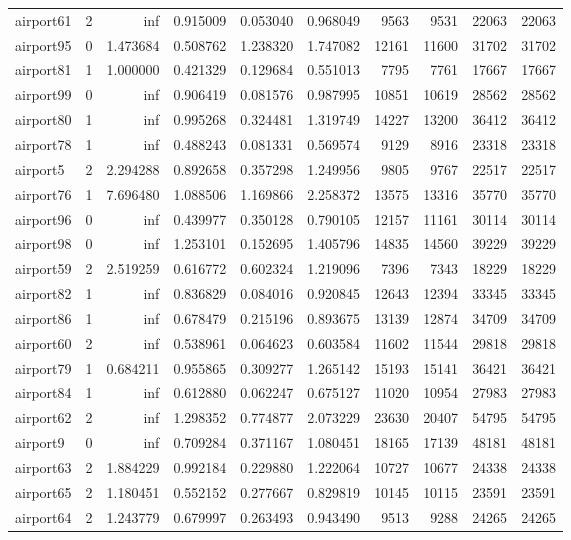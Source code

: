 \begin{longtable}{|l|r|r|r|r|r|r|r|r|r|}
airport61 & 2 & inf & 0.915009 & 0.053040 & 0.968049 & 9563 & 9531 & 22063 & 22063 \\
airport95 & 0 & 1.473684 & 0.508762 & 1.238320 & 1.747082 & 12161 & 11600 & 31702 & 31702 \\
airport81 & 1 & 1.000000 & 0.421329 & 0.129684 & 0.551013 & 7795 & 7761 & 17667 & 17667 \\
airport99 & 0 & inf & 0.906419 & 0.081576 & 0.987995 & 10851 & 10619 & 28562 & 28562 \\
airport80 & 1 & inf & 0.995268 & 0.324481 & 1.319749 & 14227 & 13200 & 36412 & 36412 \\
airport78 & 1 & inf & 0.488243 & 0.081331 & 0.569574 & 9129 & 8916 & 23318 & 23318 \\
airport5 & 2 & 2.294288 & 0.892658 & 0.357298 & 1.249956 & 9805 & 9767 & 22517 & 22517 \\
airport76 & 1 & 7.696480 & 1.088506 & 1.169866 & 2.258372 & 13575 & 13316 & 35770 & 35770 \\
airport96 & 0 & inf & 0.439977 & 0.350128 & 0.790105 & 12157 & 11161 & 30114 & 30114 \\
airport98 & 0 & inf & 1.253101 & 0.152695 & 1.405796 & 14835 & 14560 & 39229 & 39229 \\
airport59 & 2 & 2.519259 & 0.616772 & 0.602324 & 1.219096 & 7396 & 7343 & 18229 & 18229 \\
airport82 & 1 & inf & 0.836829 & 0.084016 & 0.920845 & 12643 & 12394 & 33345 & 33345 \\
airport86 & 1 & inf & 0.678479 & 0.215196 & 0.893675 & 13139 & 12874 & 34709 & 34709 \\
airport60 & 2 & inf & 0.538961 & 0.064623 & 0.603584 & 11602 & 11544 & 29818 & 29818 \\
airport79 & 1 & 0.684211 & 0.955865 & 0.309277 & 1.265142 & 15193 & 15141 & 36421 & 36421 \\
airport84 & 1 & inf & 0.612880 & 0.062247 & 0.675127 & 11020 & 10954 & 27983 & 27983 \\
airport62 & 2 & inf & 1.298352 & 0.774877 & 2.073229 & 23630 & 20407 & 54795 & 54795 \\
airport9 & 0 & inf & 0.709284 & 0.371167 & 1.080451 & 18165 & 17139 & 48181 & 48181 \\
airport63 & 2 & 1.884229 & 0.992184 & 0.229880 & 1.222064 & 10727 & 10677 & 24338 & 24338 \\
airport65 & 2 & 1.180451 & 0.552152 & 0.277667 & 0.829819 & 10145 & 10115 & 23591 & 23591 \\
airport64 & 2 & 1.243779 & 0.679997 & 0.263493 & 0.943490 & 9513 & 9288 & 24265 & 24265 \\

\end{longtable}
